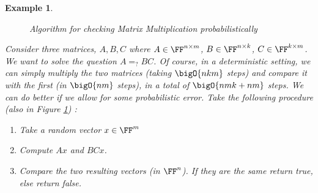 \documentclass{article}
\newtheorem{example}{Example}
\begin{document}
\begin{example}

    \begin{figure}[H]
        \centering
        \caption{Algorithm for checking Matrix Multiplication probabilistically}
        \label{matrixmultiplication}
    \end{figure}

    Consider three matrices, $A, B, C$ where $A \in \FF^{n \times m}$, $B \in \FF^{n \times k}$, $C \in \FF^{k \times m}$.
    We want to solve the question $A =_? B C$. Of course, in a deterministic setting, we can simply multiply the two matrices (taking $\bigO{nkm}$ steps) and compare it with the first (in $\bigO{nm}$ steps), in a total of $\bigO{nmk + nm}$ steps.
    We can do better if we allow for some probabilistic error. Take the following procedure (also in Figure \ref{matrixmultiplication}) :
    \begin{enumerate}
        \item Take a random vector $x \in \FF^m$
        \item Compute $Ax$ and $BCx$.
        \item Compare the two resulting vectors (in $\FF^n$). If they are the same return true, else return false.
    \end{enumerate}

\end{example}
\end{document}
